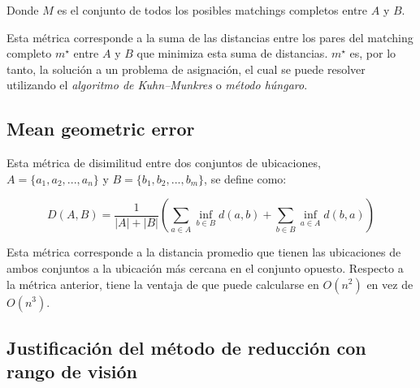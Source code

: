 Donde $M$ es el conjunto de todos los posibles matchings completos entre $A$ y $B$.

Esta métrica corresponde a la suma de las distancias entre los pares del matching completo $m^\star$ entre $A$ y $B$ que minimiza esta suma de distancias. $m^\star$ es, por lo tanto, la solución a un problema de asignación, el cual se puede resolver utilizando el \emph{algoritmo de Kuhn–Munkres} o \emph{método húngaro}.

\subsection{Mean geometric error}

Esta métrica de disimilitud entre dos conjuntos de ubicaciones, $A = \{a_1,a_2,...,a_n\}$ y $B = \{b_1,b_2,...,b_m\}$, se define como:

\begin{equation}
D(A,B) = \frac{1}{|A|+|B|}\left(\sum_{a \in A}\inf_{b \in B}d(a,b) +
\sum_{b \in B}\inf_{a \in A}d(b,a)\right)
\end{equation}

Esta métrica corresponde a la distancia promedio que tienen las ubicaciones de ambos conjuntos a la ubicación más cercana en el conjunto opuesto. Respecto a la métrica anterior, tiene la ventaja de que puede calcularse en $O(n^2)$ en vez de $O(n^3)$.

\subsection{Justificación del método de reducción con rango de visión}
\label{justificacion_reduccion}


